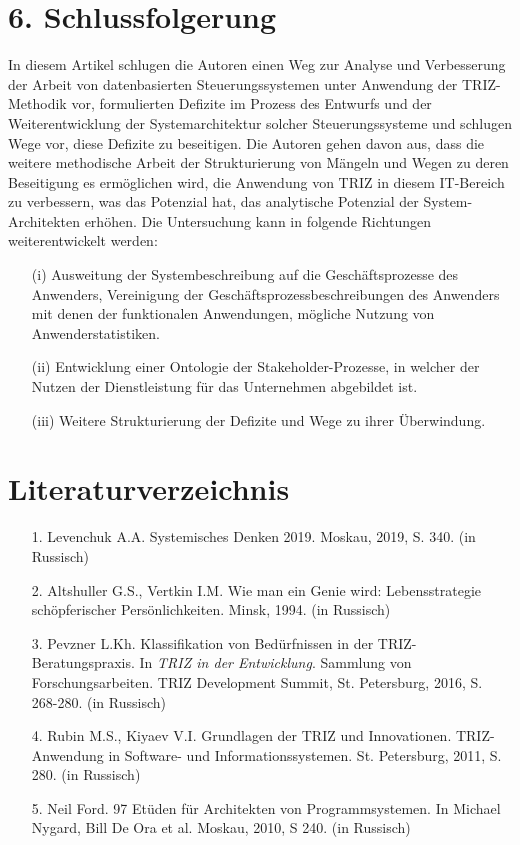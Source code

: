 \documentclass[11pt,a4paper]{article}
\begin{document}
\section*{6. Schlussfolgerung}
In diesem Artikel schlugen die Autoren einen Weg zur Analyse und Verbesserung
der Arbeit von datenbasierten Steuerungssystemen unter Anwendung der
TRIZ-Methodik vor, formulierten Defizite im Prozess des Entwurfs und der
Weiterentwicklung der Systemarchitektur solcher Steuerungssysteme und schlugen
Wege vor, diese Defizite zu beseitigen. Die Autoren gehen davon aus, dass die
weitere methodische Arbeit der Strukturierung von Mängeln und Wegen zu deren
Beseitigung es ermöglichen wird, die Anwendung von TRIZ in diesem IT-Bereich
zu verbessern, was das Potenzial hat, das analytische Potenzial der
System-Architekten erhöhen. Die Untersuchung kann in folgende Richtungen
weiterentwickelt werden: 
\begin{itemize}
\item[(i)] Ausweitung der Systembeschreibung auf die Geschäftsprozesse des
  Anwenders, Vereinigung der Geschäftsprozessbeschreibungen des Anwenders mit
  denen der funktionalen Anwendungen, mögliche Nutzung von
  Anwenderstatistiken.
\item[(ii)] Entwicklung einer Ontologie der Stakeholder-Prozesse, in welcher
  der Nutzen der Dienstleistung für das Unternehmen abgebildet ist.
\item[(iii)] Weitere Strukturierung der Defizite und Wege zu ihrer
  Überwindung.
\end{itemize}
\newpage
\section*{Literaturverzeichnis}

\begin{itemize}
\item[1.] Levenchuk A.A. Systemisches Denken 2019. Moskau, 2019, S. 340. (in
  Russisch)
\item[2.] Altshuller G.S., Vertkin I.M. Wie man ein Genie wird:
  Lebensstrategie schöpferischer Persönlichkeiten. Minsk, 1994. (in Russisch)
\item[3.] Pevzner L.Kh. Klassifikation von Bedürfnissen in der
  TRIZ-Beratungspraxis. In \emph{TRIZ in der Entwicklung}. Sammlung von
  Forschungsarbeiten.  TRIZ Development Summit, St. Petersburg, 2016,
  S. 268-280. (in Russisch)
\item[4.] Rubin M.S., Kiyaev V.I. Grundlagen der TRIZ und Innovationen.
  TRIZ-Anwendung in Software- und Informationssystemen. St. Petersburg, 2011,
  S. 280. (in Russisch)
\item[5.] Neil Ford. 97 Etüden für Architekten von Programmsystemen. In
  Michael Nygard, Bill De Ora et al. Moskau, 2010, S 240. (in Russisch)
\end{itemize}
\end{document}
